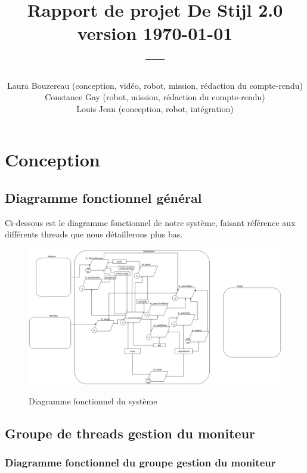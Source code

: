 \documentclass[11pt, a4paper]{paper}
\title{{\Huge Rapport de projet De Stijl 2.0}\\
{\large version \today}\\
---\\
}
\author{{Laura Bouzereau (conception, vidéo, robot, mission, rédaction du compte-rendu)}\\
{Constance Gay (robot, mission, rédaction du compte-rendu)}\\
{Louis Jean (conception, robot, intégration)}\\
}
\begin{document}
\maketitle

\newpage




\section{Conception}

\subsection{Diagramme fonctionnel général}

{Ci-dessous est le diagramme fonctionnel de notre système, faisant référence aux différents threads que nous détaillerons plus bas.}

\begin{figure}[htbp]
\begin{center}
{\includegraphics[scale=.3]{./dossier_conception/conception_generale}}
{\caption{Diagramme fonctionnel du système}}
\end{center}
\label{fig:diag_fonc_gen}
\end{figure}
\FloatBarrier

\subsection{Groupe de threads gestion du moniteur}


\subsubsection{Diagramme fonctionnel du groupe gestion du moniteur}
\end{document}

